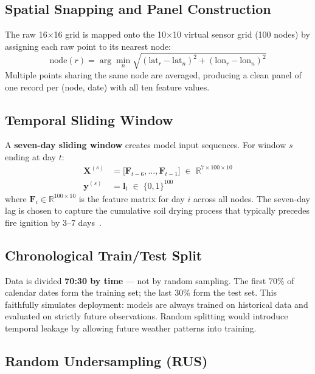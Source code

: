 \documentclass[conference]{IEEEtran}
\begin{document}
\subsection{Spatial Snapping and Panel Construction}

The raw 16$\times$16 grid is mapped onto the 10$\times$10 virtual sensor
grid (100 nodes) by assigning each raw point to its nearest node:
\begin{equation}
  \text{node}(r) = \arg\min_{n} \sqrt{(\text{lat}_r - \text{lat}_n)^2
  + (\text{lon}_r - \text{lon}_n)^2}
\end{equation}
Multiple points sharing the same node are averaged, producing a clean
panel of one record per (node, date) with all ten feature values.

\subsection{Temporal Sliding Window}

A \textbf{seven-day sliding window} creates model input sequences. For
window $s$ ending at day $t$:
\begin{align}
  \mathbf{X}^{(s)} &= \bigl[\mathbf{F}_{t-6},\ldots,\mathbf{F}_{t-1}\bigr]
    \;\in\; \mathbb{R}^{7 \times 100 \times 10} \label{eq:window}\\
  \mathbf{y}^{(s)} &= \mathbf{l}_{t} \;\in\; \{0,1\}^{100} \label{eq:label}
\end{align}
where $\mathbf{F}_i\in\mathbb{R}^{100\times 10}$ is the feature matrix
for day $i$ across all nodes. The seven-day lag is chosen to capture the
cumulative soil drying process that typically precedes fire ignition by
3–7 days~\cite{nesterov1949}.

\subsection{Chronological Train/Test Split}

Data is divided \textbf{70:30 by time} — not by random sampling. The first
70\% of calendar dates form the training set; the last 30\% form the test
set. This faithfully simulates deployment: models are always trained on
historical data and evaluated on strictly future observations. Random
splitting would introduce temporal leakage by allowing future weather
patterns into training.

\subsection{Random Undersampling (RUS)}
\end{document}
